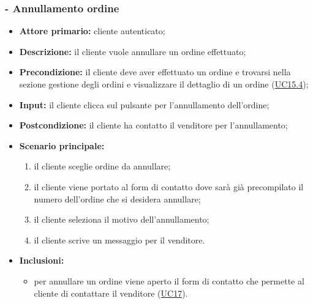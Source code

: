 \subsubsection{ - Annullamento ordine}
\begin{itemize}
    \item \textbf{Attore primario:} cliente autenticato;
    \item \textbf{Descrizione:} il cliente vuole annullare un ordine effettuato;
    \item \textbf{Precondizione:} il cliente deve aver effettuato un ordine e trovarsi nella sezione gestione degli ordini e visualizzare il dettaglio di un ordine (\hyperref[UC15.4]{UC15.4});
    \item \textbf{Input:} il cliente clicca sul pulsante per l'annullamento dell'ordine;
    \item \textbf{Postcondizione:} il cliente ha contatto il venditore per l'annullamento;
    \item \textbf{Scenario principale:}
          \begin{enumerate}
              \item il cliente sceglie ordine da annullare;
              \item il cliente viene portato al form di contatto dove sarà già precompilato il numero dell'ordine che si desidera annullare;
              \item il cliente seleziona il motivo dell'annullamento;
              \item il cliente scrive un messaggio per il venditore.
          \end{enumerate}
    \item \textbf{Inclusioni:}
          \begin{itemize}
              \item per annullare un ordine viene aperto il form di contatto che permette al cliente di contattare il venditore (\hyperref[UC17]{UC17}).
          \end{itemize}
\end{itemize}

\stepsubUserCase
